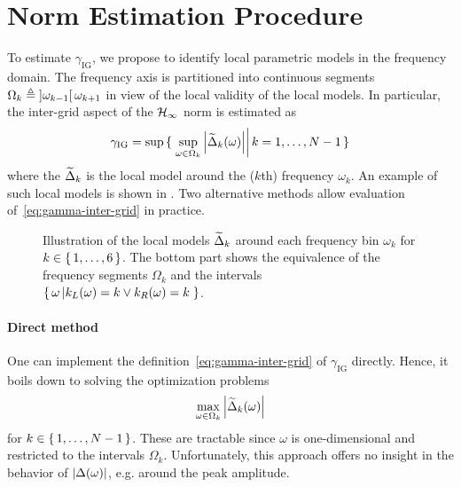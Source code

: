 \section{\Hinf{} Norm Estimation Procedure}
\label{sec:LPMHinf}
To estimate $\gamma_{\mathrm{IG}}$, we propose to identify local parametric models in the frequency domain.
The frequency axis is partitioned into continuous segments $\Omega_k \triangleq \left]  \omega_{k-1}  \right[{ \omega_{k+1} }$ in view of the local validity of the local models.
In particular, the inter-grid aspect of the $\mathcal{H}_{\infty}$ norm is estimated as
\begin{equation}
  \gamma_{\mathrm{IG}} = 
    \sup \set{ \left. 
                \sup_{\omega \in \Omega_k}  \left| \ensuremath{\widetilde{\Delta}}_k(\omega) \right|
                \right|
                k = 1,\ldots,N-1
                }
   \label{eq:gamma-inter-grid}
\end{equation}
where the $\widetilde{\Delta}_{k}$ is the local model around the ($k$th) frequency $\omega_k$.
An example of such local models is shown in .
Two alternative methods allow evaluation of~\eqref{eq:gamma-inter-grid} in practice.

\begin{figure}
  \centering
  \setlength{\figurewidth}{0.68\columnwidth}
  \setlength{\figureheight}{0.68\figurewidth}
  
  \caption[Illustration of the local models.]{Illustration of the local models $\widetilde{\Delta}_k$ around each frequency bin $\omega_k$ for $k\in\set{1,\ldots,6}$.
  The bottom part shows the equivalence of the frequency segments $\Omega_k$ and the intervals $\set{\omega \left| k_L(\omega) = k \vee k_R(\omega) = k \right.}$.}
\label{fig:interpol-quantities}
\end{figure}

\vspace{-3em}
\paragraph*{Direct method}
One can implement the definition~\eqref{eq:gamma-inter-grid} of $\gamma_{\mathrm{IG}}$ directly.
Hence, it boils down to solving the optimization problems
\begin{equation}
      \max_{\omega \in \Omega_k} 
      \left| \widetilde{\Delta}_k(\omega) \right|
      \label{eq:gamma-direct}
\end{equation}
for $k \in \set{1,\ldots,N-1}$.
These are tractable since $\omega$ is one-dimensional and restricted to the intervals $\Omega_k$.
Unfortunately, this approach offers no insight in the behavior of $\left| \Delta(\omega) \right|$, e.g. around the peak amplitude.

